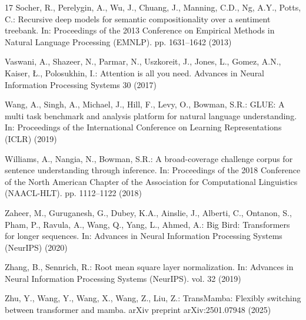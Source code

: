 \documentclass[runningheads]{llncs}
\begin{document}
\begin{thebibliography}{17}
 Socher, R., Perelygin, A., Wu, J., Chuang, J., Manning, C.D., Ng, A.Y., Potts, C.: Recursive deep models for semantic compositionality over a sentiment treebank. In: Proceedings of the 2013 Conference on Empirical Methods in Natural Language Processing (EMNLP). pp. 1631–1642 (2013)

 Vaswani, A., Shazeer, N., Parmar, N., Uszkoreit, J., Jones, L., Gomez, A.N., Kaiser, Ł., Polosukhin, I.: Attention is all you need. Advances in Neural Information Processing Systems 30 (2017)

 Wang, A., Singh, A., Michael, J., Hill, F., Levy, O., Bowman, S.R.: GLUE: A multi task benchmark and analysis platform for natural language understanding. In: Proceedings of the International Conference on Learning Representations (ICLR) (2019)

 Williams, A., Nangia, N., Bowman, S.R.: A broad-coverage challenge corpus for sentence understanding through inference. In: Proceedings of the 2018 Conference of the North American Chapter of the Association for Computational Linguistics (NAACL-HLT). pp. 1112–1122 (2018)

 Zaheer, M., Guruganesh, G., Dubey, K.A., Ainslie, J., Alberti, C., Ontanon, S., Pham, P., Ravula, A., Wang, Q., Yang, L., Ahmed, A.: Big Bird: Transformers for longer sequences. In: Advances in Neural Information Processing Systems (NeurIPS) (2020)

 Zhang, B., Sennrich, R.: Root mean square layer normalization. In: Advances in Neural Information Processing Systems (NeurIPS). vol. 32 (2019)

 Zhu, Y., Wang, Y., Wang, X., Wang, Z., Liu, Z.: TransMamba: Flexibly switching between transformer and mamba. arXiv preprint arXiv:2501.07948 (2025)

\end{thebibliography}
\end{document}
